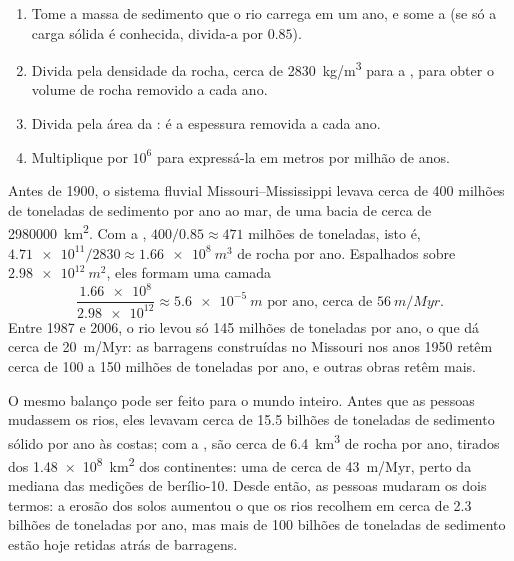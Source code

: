 \begin{method}\label{met:g12:destruction-of-mountains:budget}
\begin{enumerate}
  \item Tome a massa de sedimento que o rio carrega em um ano, e some a
         (se só a carga sólida é conhecida, divida-a por
        $0.85$).
  \item Divida pela densidade da rocha, cerca de \qty{2830}{kg/m^3} para a
        , para obter o volume de rocha removido a cada
        ano.
  \item Divida pela área da : é a espessura removida a
        cada ano.
  \item Multiplique por $10^6$ para expressá-la em metros por milhão de
        anos.
\end{enumerate}
\end{method}

\begin{example}[O Mississippi]\label{ex:g12:destruction-of-mountains:mississippi}
Antes de 1900, o sistema fluvial Missouri--Mississippi levava cerca de 400
milhões de toneladas de sedimento por ano ao mar, de uma bacia de cerca de
\qty{2980000}{km^2}. Com a , $400/0.85 \approx 471$ milhões
de toneladas, isto é, $\num{4.71e11}/2830 \approx \qty{1.66e8}{m^3}$ de
rocha por ano. Espalhados sobre $\qty{2.98e12}{m^2}$, eles formam uma camada
\[
  \frac{\num{1.66e8}}{\num{2.98e12}} \approx \qty{5.6e-5}{m}
  \text{ por ano, cerca de } \qty{56}{m/Myr}.
\]
Entre 1987 e 2006, o rio levou só 145 milhões de toneladas por ano, o que
dá cerca de \qty{20}{m/Myr}: as barragens construídas no Missouri nos anos
1950 retêm cerca de 100 a 150 milhões de toneladas por ano, e outras obras
retêm mais.
\end{example}

O mesmo balanço pode ser feito para o mundo inteiro. Antes que as pessoas
mudassem os rios, eles levavam cerca de 15.5 bilhões de toneladas de
sedimento sólido por ano às costas; com a , são cerca de
\qty{6.4}{km^3} de rocha por ano, tirados dos \qty{1.48e8}{km^2} dos
continentes: uma  de cerca de \qty{43}{m/Myr}, perto
da mediana das medições de berílio-10. Desde então, as pessoas mudaram os
dois termos: a erosão dos solos aumentou o que os rios recolhem em cerca de
2.3 bilhões de toneladas por ano, mas mais de 100 bilhões de toneladas de
sedimento estão hoje retidas atrás de barragens.

